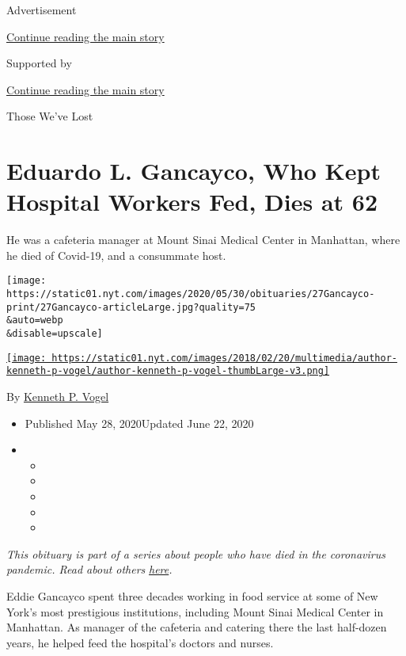 Advertisement

\protect\hyperlink{after-top}{Continue reading the main story}

Supported by

\protect\hyperlink{after-sponsor}{Continue reading the main story}

Those We've Lost

\hypertarget{eduardo-l-gancayco-who-kept-hospital-workers-fed-dies-at-62}{%
\section{Eduardo L. Gancayco, Who Kept Hospital Workers Fed, Dies at
62}\label{eduardo-l-gancayco-who-kept-hospital-workers-fed-dies-at-62}}

He was a cafeteria manager at Mount Sinai Medical Center in Manhattan,
where he died of Covid-19, and a consummate host.

\texttt{[image: https://static01.nyt.com/images/2020/05/30/obituaries/27Gancayco-print/27Gancayco-articleLarge.jpg?quality=75\\\&auto=webp\\\&disable=upscale]}

\href{https://www.nytimes.com/by/kenneth-p-vogel}{\texttt{[image: https://static01.nyt.com/images/2018/02/20/multimedia/author-kenneth-p-vogel/author-kenneth-p-vogel-thumbLarge-v3.png]}}

By \href{https://www.nytimes.com/by/kenneth-p-vogel}{Kenneth P. Vogel}

\begin{itemize}
\item
  Published May 28, 2020Updated June 22, 2020
\item
  \begin{itemize}
  \item
  \item
  \item
  \item
  \item
  \end{itemize}
\end{itemize}

\emph{This obituary is part of a series about people who have died in
the coronavirus pandemic. Read about others}
\href{https://www.nytimes.com/series/people-who-have-died-of-the-coronavirus}{\emph{here}}\emph{.}

Eddie Gancayco spent three decades working in food service at some of
New York's most prestigious institutions, including Mount Sinai Medical
Center in Manhattan. As manager of the cafeteria and catering there the
last half-dozen years, he helped feed the hospital's doctors and nurses.

